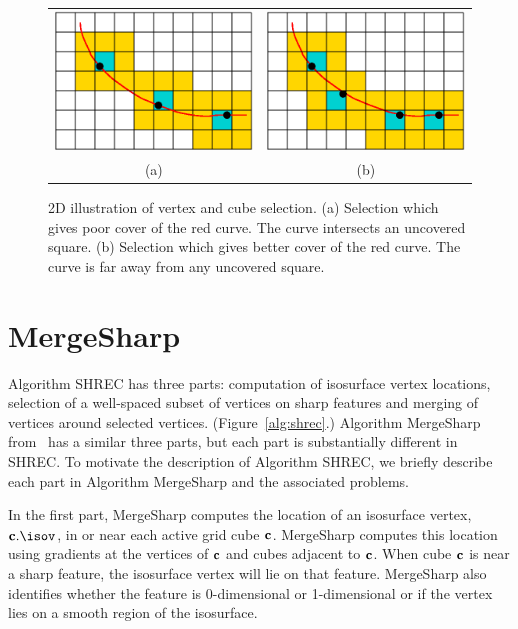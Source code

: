 \begin{figure}[t]
\centering

\begin{tabular}{cc}
\includegraphics[width=0.4\linewidth]{images/selectA.eps} \qquad &
\qquad
\includegraphics[width=0.4\linewidth]{images/selectB.eps} \\
(a) & (b)
\end{tabular}

\caption{2D illustration of vertex and cube selection.
(a) Selection which gives poor cover of the red curve.
The curve intersects an uncovered square.
(b) Selection which gives better cover of the red curve.
The curve is far away from any uncovered square.
}
\label{fig:select}
\end{figure}


\section{MergeSharp}

Algorithm SHREC has three parts:
computation of isosurface vertex locations, 
selection of a well-spaced subset of vertices on sharp features
and merging of vertices around selected vertices.
(Figure~\ref{alg:shrec}.)
Algorithm MergeSharp from~\cite{bw-cisec-13} 
has a similar three parts,
but each part is substantially different in SHREC.
To motivate the description of Algorithm SHREC,
we briefly describe each part in Algorithm MergeSharp
and the associated problems.

In the first part, 
MergeSharp computes the location of an isosurface vertex, $\cb.\isov$,
in or near each active grid cube $\mathbf{c}$.
MergeSharp computes this location using gradients at the vertices of $\mathbf{c}$
and cubes adjacent to $\mathbf{c}$.
When cube $\mathbf{c}$ is near a sharp feature,
the isosurface vertex will lie on that feature.
MergeSharp also identifies whether the feature 
is 0-dimensional or 1-dimensional
or if the vertex lies on a smooth region of the isosurface.

